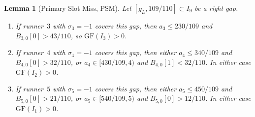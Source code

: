 \documentclass[12pt,a4paper]{amsart}
\newtheorem{lemma}[theorem]{Lemma}
\theoremstyle{definition}
\theoremstyle{remark}
\newcommand{\GF}{\mathrm{GF}}
\begin{document}
\begin{lemma}[Primary Slot Miss, PSM]\label{lem:psm}
Let $[g_L,109/110]\subset I_9$ be a right gap.
\begin{enumerate}
  \item If runner~$3$ with $\sigma_3=-1$ covers this gap, then $a_3\le 230/109$ and
        $B_{3,0}[0]>43/110$, so $\GF(I_3)>0$.
  \item If runner~$4$ with $\sigma_4=-1$ covers this gap, then either $a_4\le 340/109$ and
        $B_{4,0}[0]>32/110$, or $a_4\in[430/109,4)$ and $B_{4,0}[1]<32/110$. In either
        case $\GF(I_2)>0$.
  \item If runner~$5$ with $\sigma_5=-1$ covers this gap, then either $a_5\le 450/109$ and
        $B_{5,0}[0]>21/110$, or $a_5\in[540/109,5)$ and $B_{5,0}[0]>12/110$. In either
        case $\GF(I_1)>0$.
\end{enumerate}
\end{lemma}
\end{document}
